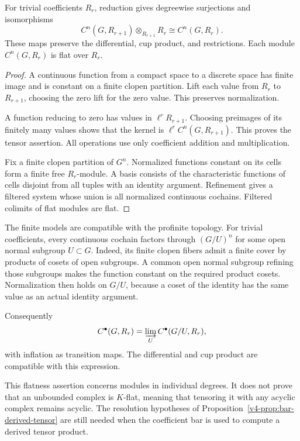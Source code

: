 \begin{proposition}\label{v4-arith:coefficients:prop:reduction}
For trivial coefficients \(R_r\), reduction gives degreewise
surjections and isomorphisms
\[
 C^n(G,R_{r+1})\otimes_{R_{r+1}}R_r
 \cong C^n(G,R_r).
\]
These maps preserve the differential, cup product, and restrictions.
Each module \(C^n(G,R_r)\) is flat over \(R_r\).
\end{proposition}
\begin{proof}
A continuous function from a compact space to a discrete space has
finite image and is constant on a finite clopen partition. Lift each
value from \(R_r\) to \(R_{r+1}\), choosing the zero lift for the zero
value. This preserves normalization.

A function reducing to zero has
values in \(\ell^rR_{r+1}\). Choosing preimages of its finitely many
values shows that the kernel is
\(\ell^rC^n(G,R_{r+1})\). This proves the tensor assertion.
All operations use only coefficient addition and multiplication.

Fix a finite clopen partition of \(G^n\). Normalized functions
constant on its cells form a finite free \(R_r\)-module. A basis
consists of the characteristic functions of cells disjoint from all
tuples with an identity argument. Refinement gives a
filtered system whose union is all normalized continuous cochains.
Filtered colimits of flat modules are flat.
\end{proof}

The finite models are compatible with the profinite topology. For
trivial coefficients, every continuous cochain factors through
\((G/U)^n\) for some open normal subgroup \(U\subset G\).
Indeed, its finite clopen fibers admit a finite cover by products of
cosets of open subgroups. A common open normal subgroup refining those
subgroups makes the function constant on the required product cosets.
Normalization then holds on \(G/U\), because a coset of the identity
has the same value as an actual identity argument.

Consequently
\[
 C^\bullet(G,R_r)=\varinjlim_U C^\bullet(G/U,R_r),
\]
with inflation as transition maps. The differential and cup product
are compatible with this expression.

This flatness assertion concerns modules in individual degrees.
It does not prove that an unbounded complex is \(K\)-flat, meaning
that tensoring it with any acyclic complex remains acyclic.
The resolution hypotheses of
Proposition~\ref{v4-prop:bar-derived-tensor} are still needed when
the coefficient bar is used to compute a derived tensor product.

